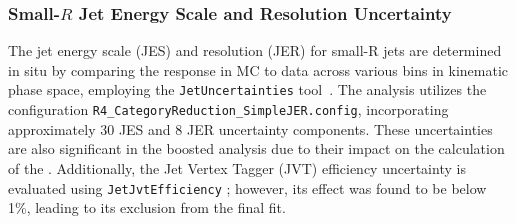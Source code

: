 
\subsubsection*{Small-$R$ Jet Energy Scale and Resolution Uncertainty}
The jet energy scale (JES) and resolution (JER) for small-R jets are determined in situ by comparing the response in MC to data across various bins in kinematic phase space, employing the \texttt{JetUncertainties} tool~\cite{JetUncertainties}. 
The analysis utilizes the configuration \texttt{R4\_CategoryReduction\_SimpleJER.config}, incorporating approximately 30 JES and 8 JER uncertainty components. These uncertainties are also significant in the boosted analysis due to their impact on the calculation of the \met. Additionally, the Jet Vertex Tagger (JVT) efficiency uncertainty is evaluated using \texttt{JetJvtEfficiency} \cite{JVTCalib}; however, its effect was found to be below 1\%, leading to its exclusion from the final fit.





